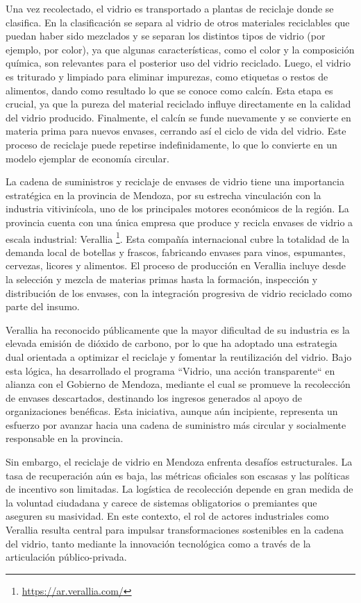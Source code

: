 Una vez recolectado, el vidrio es transportado a plantas de reciclaje donde se clasifica. En la clasificación se separa al vidrio de otros materiales reciclables que puedan haber sido mezclados y se separan los distintos tipos de vidrio (por ejemplo, por color), ya que algunas características, como el color y la composición química, son relevantes para el posterior uso del vidrio reciclado. Luego, el vidrio es triturado y limpiado para eliminar impurezas, como etiquetas o restos de alimentos, dando como resultado lo que se conoce como calcín. Esta etapa es crucial, ya que la pureza del material reciclado influye directamente en la calidad del vidrio producido. Finalmente, el calcín se funde nuevamente y se convierte en materia prima para nuevos envases, cerrando así el ciclo de vida del vidrio. Este proceso de reciclaje puede repetirse indefinidamente, lo que lo convierte en un modelo ejemplar de economía circular.

La cadena de suministros y reciclaje de envases de vidrio tiene una importancia estratégica en la provincia de Mendoza, por su estrecha vinculación con la industria vitivinícola, uno de los principales motores económicos de la región. La provincia cuenta con una única empresa que produce y recicla envases de vidrio a escala industrial: Verallia \footnote{\url{https://ar.verallia.com/}}. Esta compañía internacional cubre la totalidad de la demanda local de botellas y frascos, fabricando envases para vinos, espumantes, cervezas, licores y alimentos. El proceso de producción en Verallia incluye desde la selección y mezcla de materias primas hasta la formación, inspección y distribución de los envases, con la integración progresiva de vidrio reciclado como parte del insumo.

Verallia ha reconocido públicamente que la mayor dificultad de su industria es la elevada emisión de dióxido de carbono, por lo que ha adoptado una estrategia dual orientada a optimizar el reciclaje y fomentar la reutilización del vidrio. Bajo esta lógica, ha desarrollado el programa ``Vidrio, una acción transparente`` en alianza con el Gobierno de Mendoza, mediante el cual se promueve la recolección de envases descartados, destinando los ingresos generados al apoyo de organizaciones benéficas. Esta iniciativa, aunque aún incipiente, representa un esfuerzo por avanzar hacia una cadena de suministro más circular y socialmente responsable en la provincia.

Sin embargo, el reciclaje de vidrio en Mendoza enfrenta desafíos estructurales. La tasa de recuperación aún es baja, las métricas oficiales son escasas y las políticas de incentivo son limitadas. La logística de recolección depende en gran medida de la voluntad ciudadana y carece de sistemas obligatorios o premiantes que aseguren su masividad. En este contexto, el rol de actores industriales como Verallia resulta central para impulsar transformaciones sostenibles en la cadena del vidrio, tanto mediante la innovación tecnológica como a través de la articulación público-privada.

